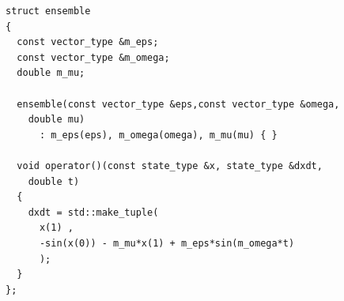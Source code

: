 \begin{frame}[fragile]


 \begin{lstlisting}[basicstyle=\scriptsize\ttfamily]
struct ensemble
{
  const vector_type &m_eps;
  const vector_type &m_omega;
  double m_mu;

  ensemble(const vector_type &eps,const vector_type &omega,
    double mu)
      : m_eps(eps), m_omega(omega), m_mu(mu) { }

  void operator()(const state_type &x, state_type &dxdt,
    double t)
  {
    dxdt = std::make_tuple(
      x(1) ,
      -sin(x(0)) - m_mu*x(1) + m_eps*sin(m_omega*t)
      );
  }
};
 \end{lstlisting}


\end{frame}


